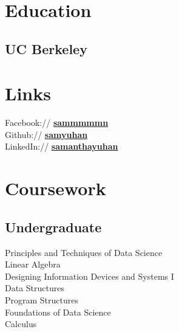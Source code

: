 \documentclass[]{deedy-resume-openfont}
\begin{document}
%
%

%
%

\begin{minipage}[t]{0.33\textwidth} 


\section{Education} 

\subsection{UC Berkeley}
\sectionsep


\section{Links} 
Facebook:// \href{https://facebook/sammmmmn}{\bf sammmmmn} \\
Github:// \href{https://github.com/samyuhan}{\bf samyuhan} \\
LinkedIn://  \href{https://www.linkedin.com/in/samanthayuhan}{\bf samanthayuhan} \\
\sectionsep


\section{Coursework}
\subsection{Undergraduate}
Principles and Techniques of Data Science \\
Linear Algebra \\
Designing Information Devices and Systems I \\
Data Structures \\
Program Structures \\
Foundations of Data Science \\
Calculus \\
\sectionsep


\end{minipage}
\end{document}
